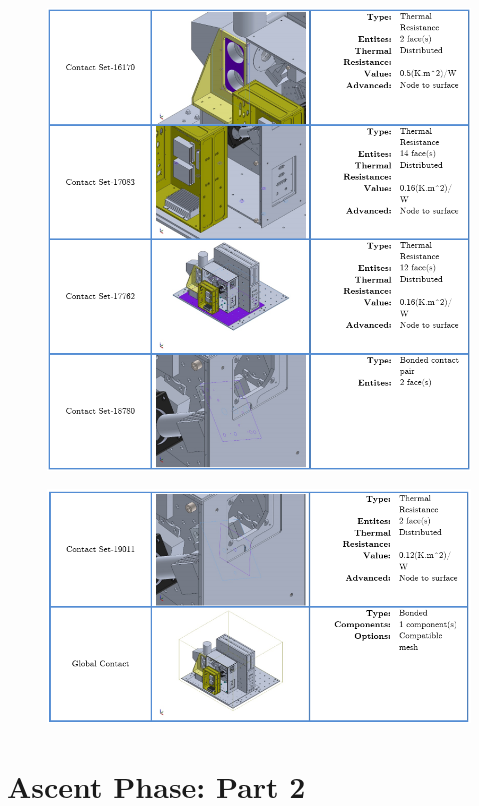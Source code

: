 \begin{figure}
    \centering
    \includegraphics[width=\textwidth]{thermal_load_images/ascent_pt1_TL_images/ascesnt_pt1_15.PNG}
\end{figure}

\begin{figure}
    \centering
    \includegraphics[width=\textwidth]{thermal_load_images/ascent_pt1_TL_images/ascesnt_pt1_16.PNG}
\end{figure}

\newpage
\section{Ascent Phase: Part 2}

